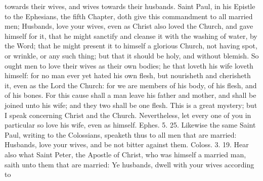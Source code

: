 towards their wives, and wives towards their husbands. Saint Paul, in his Epistle to the Ephesians, the fifth Chapter, doth give this commandment to all married men; Husbands, love your wives, even as Christ also loved the Church, and gave himself for it, that he might sanctify and cleanse it with the washing of water, by the Word; that he might present it to himself a glorious Church, not having spot, or wrinkle, or any such thing; but that it should be holy, and without blemish. So ought men to love their wives as their own bodies; he that loveth his wife loveth himself: for no man ever yet hated his own flesh, but nourisheth and cherisheth it, even as the Lord the Church: for we are members of his body, of his flesh, and of his bones. For this cause shall a man leave his father and mother, and shall be joined unto his wife; and they two shall be one flesh. This is a great mystery; but I speak concerning Christ and the Church. Nevertheless, let every one of you in particular so love his wife, even as himself. Ephes. 5. 25. Likewise the same Saint Paul, writing to the Colossians, speaketh thus to all men that are married: Husbands, love your wives, and be not bitter against them. Coloss. 3. 19. Hear also what Saint Peter, the Apostle of Christ, who was himself a married man, saith unto them that are married: Ye husbands, dwell with your wives according to

